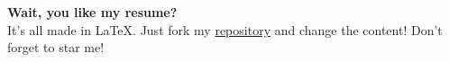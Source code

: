 \documentclass[11pt, a4paper, sans]{moderncv}
\begin{document}
    \pagestyle{empty}
    
    
    \hspace{5mm}
    \large{\textbf{Wait, you like my resume?} \\
    It's all made in \LaTeX. Just fork my \href{https://github.com/Ehsan2754/Resume.git}{\color{blue}repository} and change the content! Don't forget to star me! }
\end{document}
